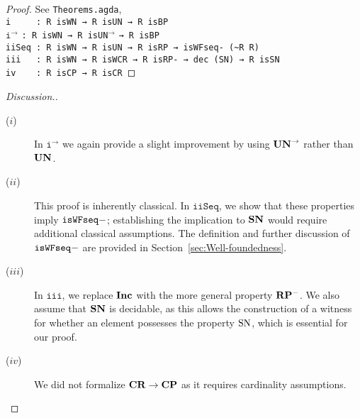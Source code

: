\begin{proof}
    See \texttt{Theorems.agda},\\
    \verb|i     : R isWN → R isUN → R isBP|\\
    $\mathtt{i^\to}$\hspace{5mm} \verb|: R isWN → R |\texttt{isUN}$^{\to}$ \verb|→ R isBP|\\
    \verb|iiSeq : R isWN → R isUN → R isRP → isWFseq- (~R R)|\\
    \verb|iii   : R isWN → R isWCR → R isRP- → dec (SN) → R isSN|\\
    \verb|iv    : R isCP → R isCR|
\end{proof}
\begin{proof}[Discussion.]\hfill
  \begin{description}
    \item[($i$)] In $\mathtt{i^\to}$ we again provide a slight improvement by using $\mathbf{UN}^{\to}$ rather than $\mathbf{UN}$.
    \item[($ii$)] This proof is inherently classical. In $\mathtt{iiSeq}$, we show that these properties imply $\mathtt{isWFseq-}$; establishing the implication to $\mathbf{SN}$ would require additional classical assumptions. The definition and further discussion of $\mathtt{isWFseq-}$ are provided in Section~\ref{sec:Well-foundedness}.
    \item[($iii$)] In $\mathtt{iii}$, we replace $\mathbf{Inc}$ with the more general property $\mathbf{RP^{-}}$. We also assume that $\mathbf{SN}$ is decidable, as this allows the construction of a witness for whether an element possesses the property $\mathrm{SN}$, which is essential for our proof.
    \item[($iv$)] We did not formalize $\mathbf{CR} \to \mathbf{CP}$ as it requires cardinality assumptions. \qedhere
  \end{description}
\end{proof}

